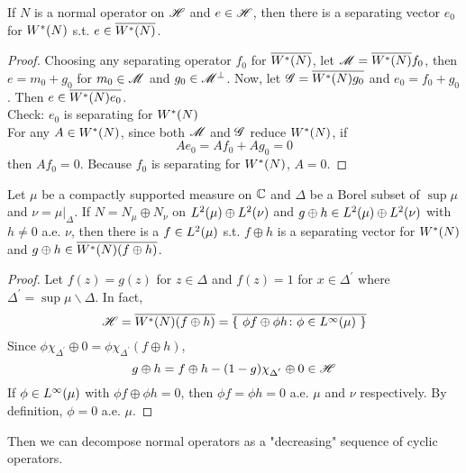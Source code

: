 \documentclass[a4paper,11pt]{report}
\begin{document}
\begin{prop}
	If $N$ is a normal operator on $\mathscr{H}$ and $e \in \mathscr{H}$, then there is a separating vector $e_0$ for $W^{*}(N)$ s.t. $e \in \overline{W^{*}(N)}$.
\end{prop}
\begin{proof}
	Choosing any separating operator $f_0$ for $\overline{W^{*}(N)}$, let $\mathscr{M} = \overline{W^{*}(N)}f_0$, then $e = m_0 + g_0$ for $m_0 \in \mathscr{M}$ and $g_0 \in \mathscr{M}^{\bot}$. Now, let $\mathscr{G} = \overline{W^{*}(N)g_0}$ and $e_0 = f_0 +g_0$. Then $e \in \overline{W^{*}(N)e_0}$.\\
	Check: $e_0$ is separating for $W^{*}(N)$\\
	For any $A \in W^{*}(N)$, since both $\mathscr{M}$ and $\mathscr{G}$ reduce $W^{*}(N)$, if
	\begin{equation*}
		Ae_0 = Af_0 + Ag_0 = 0
	\end{equation*}
	then $Af_0=0$. Because $f_0$ is separating for $W^{*}(N)$, $A = 0$.
\end{proof}

\begin{prop}
	Let $\mu$ be a compactly supported measure on $\mathbb{C}$ and $\Delta$ be a Borel subset of $\sup{\mu}$ and $\nu = \mu|_{\Delta}$. If $N = N_{\mu} \oplus N_{\nu}$ on $L^{2}(\mu) \oplus L^{2}(\nu)$ and $g\oplus h \in L^{2}(\mu) \oplus L^{2}(\nu)$ with $h \neq 0$ a.e. $\nu$, then there is a $f \in L^{2}(\mu)$ s.t. $f \oplus h$ is a separating vector for $W^{*}(N)$ and $g\oplus h \in \overline{W^{*}(N)(f \oplus h)}$.
\end{prop}
\begin{proof}
	Let $f(z) = g(z)$ for $z \in \Delta$ and $f(z) = 1$ for $x \in \Delta^{'}$ where $\Delta^{'} = \sup{\mu} \backslash \Delta$. In fact,
	\begin{equation*}
		\mathscr{H} = \overline{W^{*}(N)(f \oplus h)} = \overline{\{~\phi f \oplus \phi h \colon \phi \in L^{\infty}(\mu)~\}}
	\end{equation*}
	Since $\phi \chi_{\Delta^{'}} \oplus 0 = \phi \chi_{\Delta^{'}}(f \oplus h)$,
	\begin{equation*}
		g \oplus h = f \oplus h - (1-g)\chi_{\Delta^{'}} \oplus 0 \in \mathscr{H}
	\end{equation*}
	If $\phi \in L^{\infty}(\mu)$ with $\phi f \oplus \phi h = 0$, then $\phi f = \phi h = 0$ a.e. $\mu$ and $\nu$ respectively. By definition, $\phi = 0$ a.e. $\mu$.
\end{proof}

Then we can decompose normal operators as a "decreasing" sequence of cyclic operators.
\end{document}
